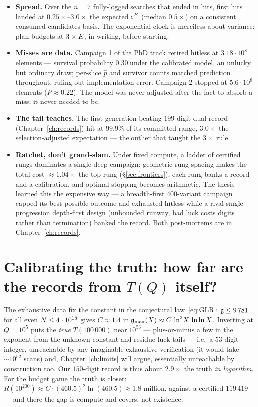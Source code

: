 \begin{itemize}
\item \textbf{Spread.} Over the $n=7$ fully-logged searches that ended
in hits, first hits landed at $0.25\times$--$3.0\times$ the expected
$e^{E}$ (median $0.5\times$) on a consistent consumed-candidates
basis. The exponential clock is merciless about variance: plan budgets
at $3\times E$, in writing, before starting.
\item \textbf{Misses are data.} Campaign 1 of the PhD track retired
hitless at $3.18\cdot10^8$ elements --- survival probability $0.30$
under the calibrated model, an unlucky but ordinary draw; per-slice
$\hat p$ and survivor counts matched prediction throughout, ruling out
implementation error. Campaign 2 stopped at $5.6\cdot10^8$ elements
($P\approx0.22$). The model was never adjusted after the fact to
absorb a miss; it never needed to be.
\item \textbf{The tail teaches.} The first-generation-beating
$199$-digit dual record (Chapter~\ref{ch:records}) hit at $99.9\%$ of
its committed range, $3.0\times$ the selection-adjusted expectation ---
the outlier that taught the $3\times$ rule.
\item \textbf{Ratchet, don't grand-slam.} Under fixed compute, a ladder
of certified rungs dominates a single deep campaign: geometric rung
spacing makes the total cost $\approx1.04\times$ the top rung
(\S\ref{sec:frontiers}), each rung banks a record and a calibration,
and optimal stopping becomes arithmetic. The thesis learned this the
expensive way --- a breadth-first 400-variant campaign capped its best
possible outcome and exhausted hitless while a rival single-progression
depth-first design (unbounded runway, bad luck costs digits rather than
termination) banked the record. Both post-mortems are in
Chapter~\ref{ch:records}.
\end{itemize}

\section{Calibrating the truth: how far are the records from $T(Q)$ itself?}\label{sec:truth}

The exhaustive data fix the constant in the conjectural
law~\eqref{eq:GLR}: $\mathfrak{g}\le9\,781$ for all even $N\le4\cdot10^{18}$
gives $C\approx1.4$ in
$\mathfrak{g}_{\max}(X)\approx C\,\ln^2\!X\,\ln\ln X$. Inverting at
$Q=10^5$ puts the \emph{true} $T(100\,000)$ near $10^{53}$ ---
plus-or-minus a few in the exponent from the unknown constant and
residue-luck tails --- i.e.\ a $53$-digit integer, unreachable by any
imaginable exhaustive verification (it would take $\sim10^{52}$ scans)
and, Chapter~\ref{ch:limits} will argue, essentially unreachable by
construction too. Our $150$-digit record is thus about $2.9\times$ the
truth \emph{in logarithm}. For the budget game the truth is closer:
$R(10^{200})\approx C\cdot(460.5)^2\ln(460.5)\approx1.8$ million,
against a certified $119\,419$ --- and there the gap is
compute-and-covers, not existence.


